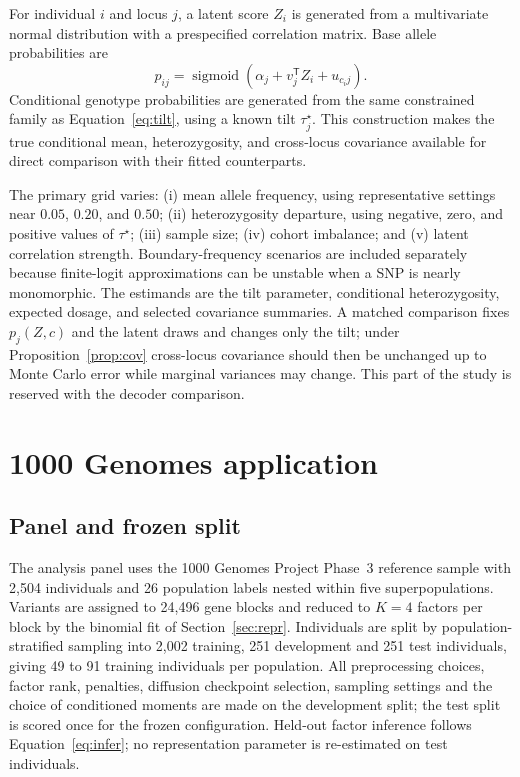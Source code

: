 \documentclass[11pt,a4paper]{article}
\newcommand{\sigmoid}{\operatorname{sigmoid}}
\begin{document}
For individual $i$ and locus $j$, a latent score $Z_i$ is generated from a
multivariate normal distribution with a prespecified correlation matrix. Base
allele probabilities are
\begin{equation}
 p_{ij}=\sigmoid(\alpha_j+v_j^{\mathsf T}Z_i+u_{c_i j}).
 \label{eq:sim-p}
\end{equation}
Conditional genotype probabilities are generated from the same constrained
family as Equation~\eqref{eq:tilt}, using a known tilt $\tau_j^{\star}$.
This construction makes the true conditional mean, heterozygosity, and
cross-locus covariance available for direct comparison with their fitted
counterparts.

The primary grid varies: (i) mean allele frequency, using representative
settings near $0.05$, $0.20$, and $0.50$; (ii) heterozygosity departure, using
negative, zero, and positive values of $\tau^{\star}$; (iii) sample size;
(iv) cohort imbalance; and (v) latent correlation strength. Boundary-frequency
scenarios are included separately because finite-logit approximations can be
unstable when a SNP is nearly monomorphic. The estimands are the tilt
parameter, conditional heterozygosity, expected dosage, and selected covariance
summaries. A matched comparison fixes $p_j(Z,c)$ and the latent draws and
changes only the tilt; under Proposition~\ref{prop:cov} cross-locus covariance
should then be unchanged up to Monte Carlo error while marginal variances may
change. This part of the study is reserved with the decoder comparison.

\section{1000 Genomes application}
\label{sec:application}

\subsection{Panel and frozen split}
\label{sec:data}

The analysis panel uses the 1000 Genomes Project Phase~3 reference sample with
2,504 individuals and 26 population labels nested within five superpopulations.
Variants are assigned to 24,496 gene blocks and reduced to $K=4$ factors per
block by the binomial fit of Section~\ref{sec:repr}. Individuals are split by
population-stratified sampling into 2,002 training, 251 development and 251
test individuals, giving 49 to 91 training individuals per population. All
preprocessing choices, factor rank, penalties, diffusion checkpoint selection,
sampling settings and the choice of conditioned moments are made on the
development split; the test split is scored once for the frozen configuration.
Held-out factor inference follows Equation~\eqref{eq:infer}; no representation
parameter is re-estimated on test individuals.
\end{document}
